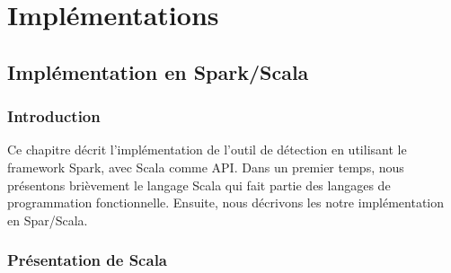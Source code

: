 \chapter{Implémentations  }

\section{Implémentation  en Spark/Scala} \label{application:spark}
\subsection{Introduction}

Ce chapitre  décrit  l'implémentation de l'outil de détection en utilisant le framework Spark, avec Scala comme API.  Dans un premier temps, nous présentons brièvement le langage Scala qui fait partie des langages de programmation fonctionnelle. Ensuite, nous 
décrivons les notre implémentation en Spar/Scala.

\subsection{Présentation de Scala} \label{scala-presentation}



